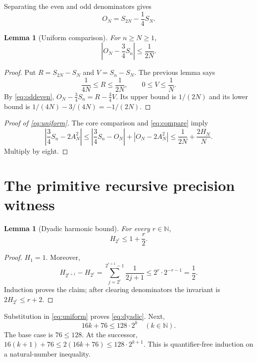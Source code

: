 \documentclass[11pt,a4paper]{article}
\newtheorem{lemma}[theorem]{Lemma}
\theoremstyle{remark}\newtheorem{remark}[theorem]{Remark}
\newcommand{\N}{\mathbb N}
\newcommand{\abs}[1]{\left|#1\right|}
\begin{document}
Separating the even and odd denominators gives
\begin{equation}\label{eq:oddeven}
 O_N=S_{2N}-\frac14S_N.
\end{equation}

\begin{lemma}[Uniform comparison]\label{lem:compare}
For $n\ge N\ge1$,
\begin{equation}\label{eq:compare}
 \abs{O_N-\frac34S_n}\le\frac1{2N}.
\end{equation}
\end{lemma}
\begin{proof}
Put $R=S_{2N}-S_N$ and $V=S_n-S_N$. The previous lemma says
\[
 \frac1{4N}\le R\le\frac1{2N},\qquad 0\le V\le\frac1N.
\]
By \eqref{eq:oddeven}, $O_N-\frac34S_n=R-\frac34V$.
Its upper bound is $1/(2N)$ and its lower bound is
$1/(4N)-3/(4N)=-1/(2N)$.
\end{proof}

\begin{proof}[Proof of \eqref{eq:uniform}]
The core comparison and \eqref{eq:compare} imply
\[
 \abs{\frac34S_n-2A_N^2}
 \le\abs{\frac34S_n-O_N}+\abs{O_N-2A_N^2}
 \le\frac1{2N}+\frac{2H_N}{N}.
\]
Multiply by eight.
\end{proof}

\section{The primitive recursive precision witness}\label{sec:modulus}

\begin{lemma}[Dyadic harmonic bound]\label{lem:harmonic}
For every $r\in\N$,
\begin{equation}\label{eq:harmonic}
 H_{2^r}\le1+\frac r2.
\end{equation}
\end{lemma}
\begin{proof}
$H_1=1$. Moreover,
\[
 H_{2^{r+1}}-H_{2^r}
 =\sum_{j=2^r}^{2^{r+1}-1}\frac1{2j+1}
 \le2^r\cdot2^{-r-1}=\frac12.
\]
Induction proves the claim; after clearing denominators the invariant
is $2H_{2^r}\le r+2$.
\end{proof}

Substitution in \eqref{eq:uniform} proves \eqref{eq:dyadic}.
Next,
\begin{equation}\label{eq:growth}
 16k+76\le128\cdot2^k\quad(k\in\N).
\end{equation}
The base case is $76\le128$. At the successor,
$16(k+1)+76\le2(16k+76)\le128\cdot2^{k+1}$.
This is quantifier-free induction on a natural-number inequality.
\end{document}

